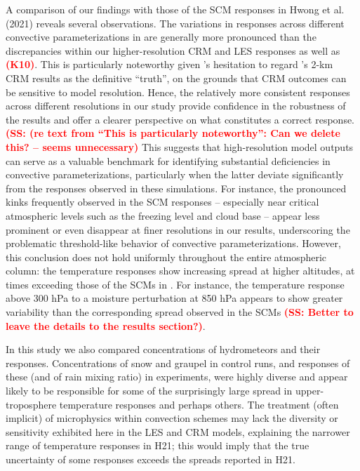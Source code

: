 \documentclass[draft]{agujournal2019}
\newcommand{\todo}[1]{\textcolor{red}{\textbf{(#1)}}}
\begin{document}
A comparison of our findings with those of the SCM responses in Hwong et al.
(2021) reveals several observations. The variations in responses across
different convective parameterizations in  are generally
more pronounced than the discrepancies within our higher-resolution CRM and LES
responses as well as \todo{K10}. This is particularly noteworthy
given \citeauthor{Hwong_JAMES_2021}'s \citeyear{Hwong_JAMES_2021} hesitation to regard \citeauthor{Kuang_JAS_2010}'s \citeyear{Kuang_JAS_2010} 2-km CRM results as the definitive
``truth'', on the grounds that CRM outcomes can be sensitive to model
resolution. Hence, the relatively more consistent responses across different
resolutions in our study provide confidence in the robustness of the results and
offer a clearer perspective on what constitutes a correct response. \todo{SS: (re text from ``This is particularly noteworthy'': Can we delete this? -- seems unnecessary} This
suggests that high-resolution model outputs can serve as a valuable benchmark
for identifying substantial deficiencies in convective parameterizations,
particularly when the latter deviate significantly from the responses observed
in these simulations. For instance, the pronounced kinks frequently observed in
the SCM responses -- especially near critical atmospheric levels such as the
freezing level and cloud base -- appear less prominent or even disappear at
finer resolutions in our results, underscoring the problematic threshold-like
behavior of convective parameterizations. However, this conclusion does not hold
uniformly throughout the entire atmospheric column: the
temperature responses show increasing spread at
higher altitudes, at times exceeding those of the SCMs in
. For instance, the temperature response above 300 hPa
to a moisture perturbation at 850 hPa appears to show greater variability than
the corresponding spread observed in the SCMs \todo{SS: Better to leave the details to the results section?}.

In this study we also compared concentrations of hydrometeors and their responses. Concentrations of snow and graupel in control runs, and responses of these (and of rain mixing ratio) in experiments, were highly diverse and appear likely to be responsible for some of the surprisingly large spread in upper-
troposphere temperature responses and perhaps others. The treatment (often implicit) of microphysics within convection schemes may lack the diversity or sensitivity exhibited here in the LES and CRM models, explaining the narrower range of temperature responses in H21; this would imply that the true uncertainty of some responses exceeds the spreads reported in H21.
\end{document}
